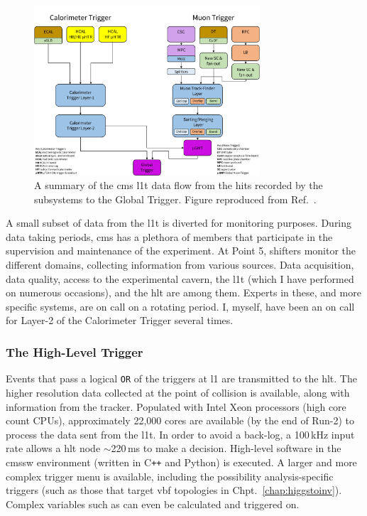 \begin{figure}[htbp]
    \centering
    \includegraphics[width=0.75\textwidth]{figures/CMS_L1T_data_flow_key_ordered.pdf}
    \caption[A summary of the CMS Level-1 Trigger data flow from the hits recorded by the subsystems to the Global Trigger]{A summary of the \acrshort{cms} \acrlong{l1t} data flow from the hits recorded by the subsystems to the Global Trigger. Figure reproduced from Ref.~.}
    \label{fig:cms_l1t_data_flow}
\end{figure}

A small subset of data from the \acrshort{l1t} is diverted for monitoring purposes. During data taking periods, \acrshort{cms} has a plethora of members that participate in the supervision and maintenance of the experiment. At Point 5, shifters monitor the different domains, collecting information from various sources. Data acquisition, data quality, access to the experimental cavern, the \acrshort{l1t} (which I have performed on numerous occasions), and the \acrshort{hlt} are among them. Experts in these, and more specific systems, are on call on a rotating period. I, myself, have been an on call for Layer-2 of the Calorimeter Trigger several times.




\subsubsection{The High-Level Trigger}
\label{subsubsec:detector_hlt}

Events that pass a logical \texttt{OR} of the triggers at \acrlong{l1} are transmitted to the \acrshort{hlt}. The higher resolution data collected at the point of collision is available, along with information from the tracker. Populated with Intel Xeon processors (high core count CPUs), approximately 22,000 cores are available (by the end of Run-2) to process the data sent from the \acrshort{l1t}. In order to avoid a back-log, a 100\,kHz input rate allows a \acrshort{hlt} node $\sim$220\,ms to make a decision. High-level software in the \acrshort{cmssw} environment (written in C\texttt{++} and Python) is executed. A larger and more complex trigger menu is available, including the possibility analysis-specific triggers (such as those that target \acrshort{vbf} topologies in Chpt.~\ref{chap:higgstoinv}). Complex variables such as \alphaT can even be calculated and triggered on.


